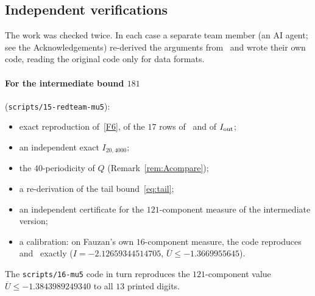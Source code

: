 \documentclass[11pt]{article}
\theoremstyle{remark}
\newcommand{\Ubar}{\overline{U}}
\newcommand{\file}[1]{\texttt{#1}}
\begin{document}
\subsection{Independent verifications}\label{sec:indep}

The work was checked twice. In each case a separate team member (an AI agent; see the Acknowledgements) re-derived the arguments from~\cite{F} and wrote their own code, reading the original code only for data formats.

\paragraph{For the intermediate bound $181$} (\file{scripts/15-redteam-mu5}):
\begin{itemize}
\item exact reproduction of~\ref{F6}, of the $17$ rows of~\cite[Table~3]{F} and of $I_{\rm out}$;
\item an independent exact $I_{20,4000}$;
\item the $40$-periodicity of $Q$ (Remark~\ref{rem:Acompare});
\item a re-derivation of the tail bound~\eqref{eq:tail};
\item an independent certificate for the $121$-component measure of the intermediate version;
\item a calibration: on Fauzan's own $16$-component measure, the code reproduces~\cite[(A.10)]{F} and~\cite[(6.4)]{F} exactly ($I=-2.12659344514705$, $\Ubar\le-1.3669955645$).
\end{itemize}
The \file{scripts/16-mu5} code in turn reproduces the $121$-component value $\Ubar\le-1.3843989249340$ to all $13$ printed digits.
\end{document}
